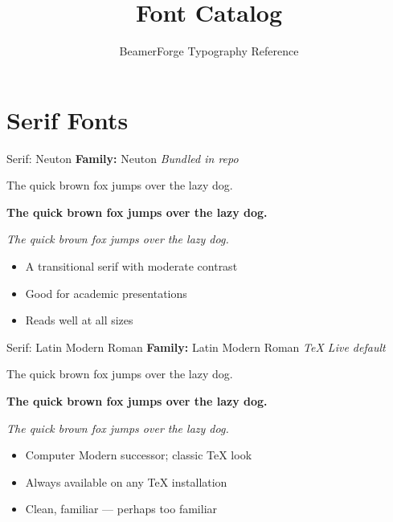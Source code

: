 \documentclass[10pt]{beamer}
\title{Font Catalog}
\subtitle{BeamerForge Typography Reference}
\date{}
\begin{document}
\section{Serif Fonts}

\setmainfont[
  Path = ../../recipes/d-rose/font/,
  UprightFont = Neuton-Regular.ttf,
  ItalicFont = Neuton-Italic.ttf,
  BoldFont = Neuton-ExtraBold.ttf
]{Neuton}

\begin{frame}{Serif: Neuton}
  \textbf{Family:} Neuton \hfill \textit{Bundled in repo}

  \vspace{0.3cm}
  {\Large The quick brown fox jumps over the lazy dog.}

  \vspace{0.2cm}
  \textbf{The quick brown fox jumps over the lazy dog.}

  \vspace{0.2cm}
  \textit{The quick brown fox jumps over the lazy dog.}

  \vspace{0.3cm}
  \begin{itemize}
    \item A transitional serif with moderate contrast
    \item Good for academic presentations
    \item Reads well at all sizes
  \end{itemize}
\end{frame}

\setmainfont{Latin Modern Roman}

\begin{frame}{Serif: Latin Modern Roman}
  \textbf{Family:} Latin Modern Roman \hfill \textit{TeX Live default}

  \vspace{0.3cm}
  {\Large The quick brown fox jumps over the lazy dog.}

  \vspace{0.2cm}
  \textbf{The quick brown fox jumps over the lazy dog.}

  \vspace{0.2cm}
  \textit{The quick brown fox jumps over the lazy dog.}

  \vspace{0.3cm}
  \begin{itemize}
    \item Computer Modern successor; classic TeX look
    \item Always available on any TeX installation
    \item Clean, familiar — perhaps too familiar
  \end{itemize}
\end{frame}
\end{document}
